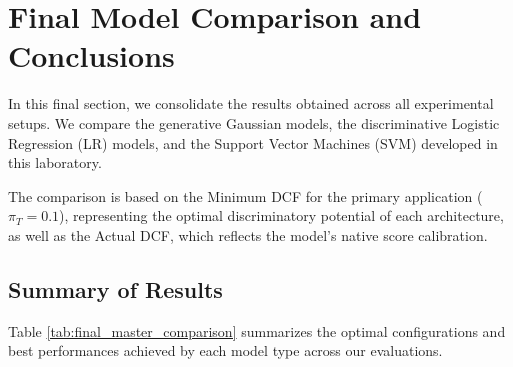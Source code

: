 \chapter{Final Model Comparison and Conclusions}
\label{chap:final_comparison}

In this final section, we consolidate the results obtained across all experimental setups. We compare the generative Gaussian models, the discriminative Logistic Regression (LR) models, and the Support Vector Machines (SVM) developed in this laboratory. 

The comparison is based on the Minimum DCF for the primary application ($\pi_T = 0.1$), representing the optimal discriminatory potential of each architecture, as well as the Actual DCF, which reflects the model's native score calibration.

\section{Summary of Results}

Table \ref{tab:final_master_comparison} summarizes the optimal configurations and best performances achieved by each model type across our evaluations.

\begin{table}[H]
\centering
\caption{Comprehensive Model Comparison ($\pi_T = 0.1$)}
\label{tab:final_master_comparison}
\end{table}

